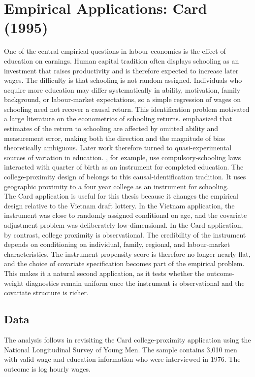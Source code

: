 \documentclass[12pt, a4paper, oneside]{article}
\theoremstyle{plain}
\theoremstyle{definition}
\begin{document}
\newpage

\section{Empirical Applications: Card (1995)}
\label{sec:card_ae}
One of the central empirical questions in labour economics is the effect of education on earnings. Human capital tradition often displays schooling as an investment that raises productivity and is therefore expected to increase later wages. The difficulty is that schooling is not random assigned. Individuals who acquire more education may differ systematically in ability, motivation, family background, or labour-market expectations, so a simple regression of wages on schooling need not recover a causal return.
This identification problem motivated a large literature on the econometrics of schooling returns. \citet{griliches1977estimating} emphasized that estimates of the return to schooling are affected by omitted ability and measurement error, making both the direction and the magnitude of bias theoretically ambiguous. Later work therefore turned to quasi-experimental sources of variation in education. \citet{angrist1991does}, for example, use compulsory-schooling laws interacted with quarter of birth as an instrument for completed education. The college-proximity design of \citet{card1993using} belongs to this causal-identification tradition. It uses geographic proximity to a four year college as an instrument for schooling. \\
The Card application is useful for this thesis because it changes the empirical design relative to the Vietnam draft lottery. In the Vietnam application, the instrument was close to randomly assigned conditional on age, and the covariate adjustment problem was deliberately low-dimensional. In the Card application, by contrast, college proximity is observational. The credibility of the instrument depends on conditioning on individual, family, regional, and labour-market characteristics. The instrument propensity score is therefore no longer nearly flat, and the choice of covariate specification becomes part of the empirical problem.
This makes it a natural second application,
 as it tests whether the outcome-weight diagnostics remain uniform once the instrument is observational and the covariate structure is richer.



\subsection{Data}
The analysis follows \citet{sloczynski2025abadie} in revisiting the Card college-proximity application using the National Longitudinal Survey of Young Men. The sample contains 3,010 men with valid wage and education information who were interviewed in 1976. The outcome is log hourly wages. 
\end{document}
